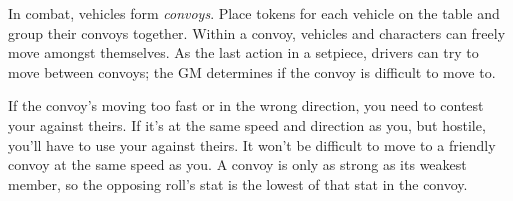 
In combat, vehicles form \emph{convoys}. Place tokens for each vehicle on the table and group their convoys together. Within a convoy, vehicles and characters can freely move amongst themselves. As the last action in a setpiece, drivers can try to move between convoys; the GM determines if the convoy is difficult to move to.

If the convoy's moving too fast or in the wrong direction, you need to contest your  against theirs. If it's at the same speed and direction as you, but hostile, you'll have to use your  against theirs. It won't be difficult to move to a friendly convoy at the same speed as you. A convoy is only as strong as its weakest member, so the opposing roll's stat is the lowest of that stat in the convoy.
